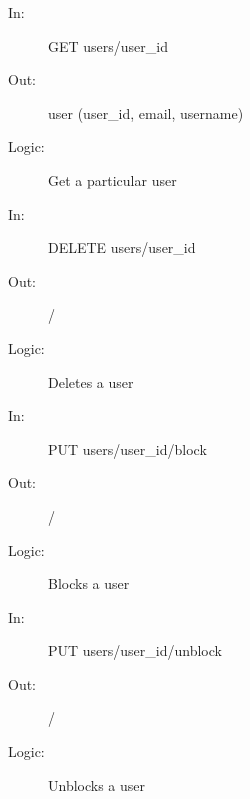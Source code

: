 \documentclass{article}
\begin{document}
\begin{description}
\begin{description}
        \item[]
    \end{description}
    \begin{description}
        \item[In:] GET users/user\_id
        \item[Out:] user (user\_id, email, username)
        \item[Logic:] Get a particular user
        \item[]
    \end{description}
    \begin{description}
        \item[In:] DELETE users/user\_id
        \item[Out:] /
        \item[Logic:] Deletes a user
        \item[]
    \end{description}
    \begin{description}
        \item[In:] PUT users/user\_id/block
        \item[Out:] /
        \item[Logic:] Blocks a user
        \item[]
    \end{description}
    \begin{description}
        \item[In:] PUT users/user\_id/unblock
        \item[Out:] /
        \item[Logic:] Unblocks a user
    \end{description}
\end{description}
\end{document}
